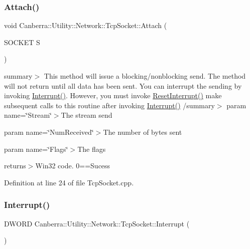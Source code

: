 \subsubsection{\texorpdfstring{Attach()}{Attach()}}
{\footnotesize\ttfamily void Canberra\+::\+Utility\+::\+Network\+::\+Tcp\+Socket\+::\+Attach (\begin{DoxyParamCaption}\item[{S\+O\+C\+K\+ET}]{S }\end{DoxyParamCaption})\hspace{0.3cm}{\ttfamily [protected]}}

summary$>$ This method will issue a blocking/nonblocking send. The method will not return until all data has been sent. You can interrupt the sending by invoking \hyperlink{class_canberra_1_1_utility_1_1_network_1_1_tcp_socket_ad0329ac027d48c11de687d8bad972c0d_ad0329ac027d48c11de687d8bad972c0d}{Interrupt()}. However, you must invoke \hyperlink{class_canberra_1_1_utility_1_1_network_1_1_tcp_socket_a558fbc89e7a2682ef3370bf8d3020764_a558fbc89e7a2682ef3370bf8d3020764}{Reset\+Interrupt()} make subsequent calls to this routine after invoking \hyperlink{class_canberra_1_1_utility_1_1_network_1_1_tcp_socket_ad0329ac027d48c11de687d8bad972c0d_ad0329ac027d48c11de687d8bad972c0d}{Interrupt()} /summary$>$ param name=\char`\"{}\+Stream\char`\"{}$>$The stream send

param name=\char`\"{}\+Num\+Received\char`\"{}$>$The number of bytes sent

param name=\char`\"{}\+Flags\char`\"{}$>$The flags

returns$>$Win32 code. 0==Sucess

Definition at line 24 of file Tcp\+Socket.\+cpp.

\mbox{\label{class_canberra_1_1_utility_1_1_network_1_1_tcp_socket_ad0329ac027d48c11de687d8bad972c0d_ad0329ac027d48c11de687d8bad972c0d}} 
\subsubsection{\texorpdfstring{Interrupt()}{Interrupt()}}
{\footnotesize\ttfamily D\+W\+O\+RD Canberra\+::\+Utility\+::\+Network\+::\+Tcp\+Socket\+::\+Interrupt (\begin{DoxyParamCaption}{ }\end{DoxyParamCaption})}

